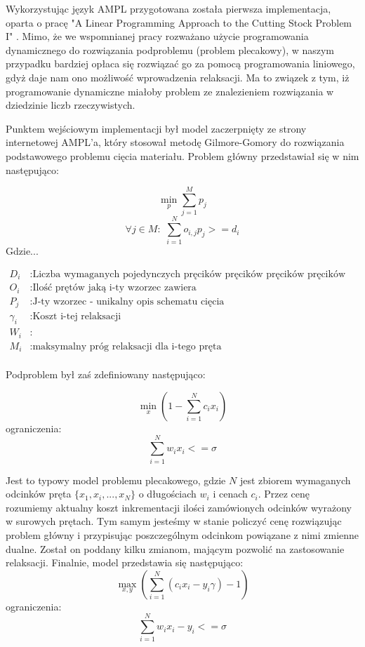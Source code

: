 Wykorzystując język AMPL przygotowana została pierwsza implementacja, oparta o pracę "A Linear Programming Approach to the Cutting Stock Problem I" \cite{linear-programming}. Mimo, że we wspomnianej pracy rozważano użycie programowania dynamicznego do rozwiązania podproblemu (problem plecakowy), w naszym przypadku bardziej opłaca się rozwiązać go za pomocą programowania liniowego, gdyż daje nam ono możliwość wprowadzenia relaksacji. Ma to związek z tym, iż programowanie dynamiczne miałoby problem ze znalezieniem rozwiązania w dziedzinie liczb rzeczywistych. 

Punktem wejściowym implementacji był model zaczerpnięty ze strony internetowej AMPL'a, który stosował metodę Gilmore-Gomory do rozwiązania podstawowego problemu cięcia materiału. Problem główny przedstawiał się w nim następująco:

\[\min_p \sum_{j=1}^{M} p_j\]
\[\forall{j} \! \in \! M\!: \,\, \sum_{i=1}^{N} o_{i,j} p_j >= d_i\]
Gdzie...

\begin{align*}
D_i & : \text{Liczba wymaganych pojedynczych pręcików pręcików pręcików pręcików pręcików} \\
O_i & : \text{Ilość prętów jaką i-ty wzorzec zawiera} \\
P_j & : \text{J-ty wzorzec - unikalny opis schematu cięcia} \\
\gamma_i & : \text{Koszt i-tej relaksacji} \\
W_i & : \text{} \\
M_i & : \text{maksymalny próg relaksacji dla i-tego pręta} \\
\end{align*}

Podproblem był zaś zdefiniowany następująco:

\[\min_x (1 - \sum_{i=1}^{N} c_i x_i )\]
ograniczenia:
\[\sum_{i=1}^{N} w_i x_i <= \sigma\]

Jest to typowy model problemu plecakowego, gdzie \(N\) jest zbiorem wymaganych odcinków pręta \(\{x_1, x_i,...,x_N\}\) o długościach \(w_i\) i cenach \(c_i\). Przez cenę rozumiemy aktualny koszt inkrementacji ilości zamówionych odcinków wyrażony w surowych prętach. Tym samym jesteśmy w stanie policzyć cenę rozwiązując problem główny i przypisując poszczególnym odcinkom powiązane z nimi zmienne dualne.
Został on poddany kilku zmianom, mającym pozwolić na zastosowanie relaksacji. Finalnie, model przedstawia się następująco:
\[\max_{x,y} (\sum_{i=1}^{N} (c_i x_i - y_i \gamma) - 1)\]
ograniczenia:
\begin{displaymath}
\sum_{i=1}^{N} w_i x_i - y_i <= \sigma
\label{ograniczenie1}
\end{displaymath}

